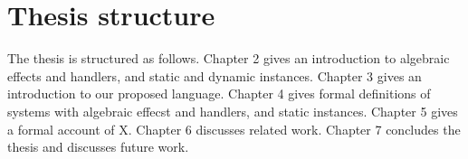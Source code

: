 \section*{Thesis structure}
The thesis is structured as follows.
Chapter 2 gives an introduction to algebraic effects and handlers, and static and dynamic instances.
Chapter 3 gives an introduction to our proposed language.
Chapter 4 gives formal definitions of systems with algebraic effecst and handlers, and static instances.
Chapter 5 gives a formal account of X.
Chapter 6 discusses related work.
Chapter 7 concludes the thesis and discusses future work.
